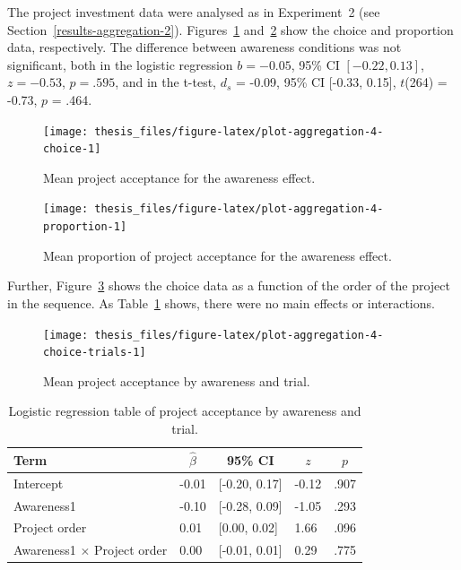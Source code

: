 \documentclass[a4paper, nobind, dvipsnames]{templates/ociamthesis}
\theoremstyle{definition}
\theoremstyle{definition}
\theoremstyle{definition}
\theoremstyle{definition}
\theoremstyle{remark}
\begin{document}
The project investment data were analysed as in Experiment~2 (see
Section~\ref{results-aggregation-2}).
Figures~\ref{fig:plot-aggregation-4-choice}
and~\ref{fig:plot-aggregation-4-proportion} show the choice and proportion
data, respectively. The difference between awareness conditions was not
significant, both in the logistic regression
\(b = -0.05\), 95\% CI \([-0.22, 0.13]\), \(z = -0.53\), \(p = .595\), and in the t-test,
\(d_s\) = -0.09, 95\% CI {[}-0.33, 0.15{]}, \(t\)(264) = -0.73, \(p\) = .464.



\begin{figure}
\texttt{[image: thesis\_files/figure-latex/plot-aggregation-4-choice-1]} \caption{Mean project acceptance for the awareness effect.}\label{fig:plot-aggregation-4-choice}
\end{figure}



\begin{figure}
\texttt{[image: thesis\_files/figure-latex/plot-aggregation-4-proportion-1]} \caption{Mean proportion of project acceptance for the awareness effect.}\label{fig:plot-aggregation-4-proportion}
\end{figure}

Further, Figure~\ref{fig:plot-aggregation-4-choice-trials} shows the choice
data as a function of the order of the project in the sequence. As
Table~\ref{tab:awareness-project-order} shows, there were no main effects or
interactions.



\begin{figure}
\texttt{[image: thesis\_files/figure-latex/plot-aggregation-4-choice-trials-1]} \caption{Mean project acceptance by awareness and trial.}\label{fig:plot-aggregation-4-choice-trials}
\end{figure}

\begin{table}[tbp]

\begin{center}
\begin{threeparttable}

\caption{\label{tab:awareness-project-order}Logistic regression table of project acceptance by awareness and trial.}

\begin{tabular}{lllll}
\toprule
Term & \multicolumn{1}{c}{$\hat{\beta}$} & \multicolumn{1}{c}{95\% CI} & \multicolumn{1}{c}{$z$} & \multicolumn{1}{c}{$p$}\\
\midrule
Intercept & -0.01 & {}[-0.20, 0.17] & -0.12 & .907\\
Awareness1 & -0.10 & {}[-0.28, 0.09] & -1.05 & .293\\
Project order & 0.01 & {}[0.00, 0.02] & 1.66 & .096\\
Awareness1 $\times$ Project order & 0.00 & {}[-0.01, 0.01] & 0.29 & .775\\
\bottomrule
\end{tabular}

\end{threeparttable}
\end{center}

\end{table}
\end{document}
